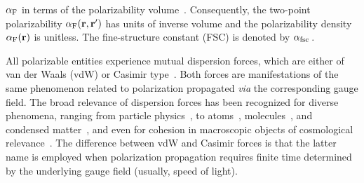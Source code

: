 \documentclass[aps,prl,twocolumn,showpacs,groupaddress]{revtex4-1}
\newcommand{\via}{\emph{via }}
\newcommand{\bbb}[1]{{\color{black}#1}}
\begin{document}
$\alpha_{\rm F}$ in terms of the polarizability volume~\cite{Atkins&Friedman_book}. Consequently, the two-point polarizability $\alpha_{\rm F}({\bf r}, {\bf r'})$ has units of %
inverse volume and the polarizability density
$\alpha_{\rm F}({\bf r})$ is unitless. The fine-structure constant (FSC) is denoted by $\alpha_{\rm fsc}\,$.

All polarizable entities experience mutual dispersion forces, which are either of van der Waals (vdW) or Casimir \bbb{type}~\cite{London,Casimir1948,Stone-book,VDW-book,Buhmann-book_I,Buhmann-book_II}. Both forces are manifestations of the same phenomenon related to polarization propagated \via the corresponding gauge field. The broad relevance of dispersion forces has been recognized for diverse phenomena, ranging from particle physics~\cite{Volodya-PRL}, to atoms~\cite{Babb}, molecules~\cite{Jan-ChemRev}, and condensed matter~\cite{Casimir-RMP,LongRange-RMP}, and even for cohesion in macroscopic objects of cosmological relevance~\cite{Nature-Asteroids,Asteroids}. The difference between vdW and Casimir forces is that the latter name is employed when polarization propagation requires finite time determined by the underlying gauge field (usually, speed of light). 
\end{document}
